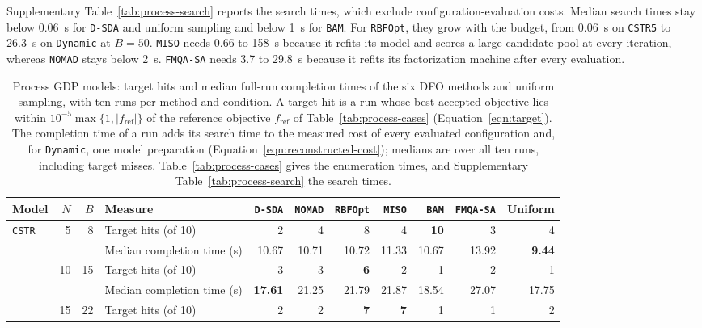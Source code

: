 \documentclass{article}
\begin{document}
Supplementary Table~\ref{tab:process-search} reports the search times, which exclude configuration-evaluation costs.
Median search times stay below 0.06~s for \texttt{D-SDA} and uniform sampling and below 1~s for \texttt{BAM}.
For \texttt{RBFOpt}, they grow with the budget, from 0.06~s on \texttt{CSTR5} to 26.3~s on \texttt{Dynamic} at \(B=50\).
\texttt{MISO} needs 0.66 to 158~s because it refits its model and scores a large candidate pool at every iteration, whereas \texttt{NOMAD} stays below 2~s.
\texttt{FMQA-SA} needs 3.7 to 29.8~s because it refits its factorization machine after every evaluation.
\begin{table}[htbp]
\centering
\caption{Process GDP models: target hits and median full-run completion times of the six DFO methods and uniform sampling, with ten runs per method and condition.
A target hit is a run whose best accepted objective lies within \(10^{-5}\max\{1,|f_{\mathrm{ref}}|\}\) of the reference objective \(f_{\mathrm{ref}}\) of Table~\ref{tab:process-cases} (Equation~\eqref{eqn:target}).
The completion time of a run adds its search time to the measured cost of every evaluated configuration and, for \texttt{Dynamic}, one model preparation (Equation~\eqref{eqn:reconstructed-cost}); medians are over all ten runs, including target misses.
Table~\ref{tab:process-cases} gives the enumeration times, and Supplementary Table~\ref{tab:process-search} the search times.}
\label{tab:process-targets}
\footnotesize
\setlength{\tabcolsep}{3.5pt}
\begin{threeparttable}
\begin{tabular}{@{}lrrlrrrrrrr@{}}\toprule
Model & \(N\) & \(B\) & Measure & \texttt{D-SDA} & \texttt{NOMAD} & \texttt{RBFOpt} & \texttt{MISO} & \texttt{BAM} & \texttt{FMQA-SA} & Uniform \\\midrule
\multirow{12}{*}{\texttt{CSTR}} & \multirow{2}{*}{5} & \multirow{2}{*}{8} & Target hits (of 10) & 2 & 4 & 8 & 4 & \textbf{10} & 3 & 4 \\
 & &  & Median completion time (s) & 10.67 & 10.71 & 10.72 & 11.33 & 10.67 & 13.92 & \textbf{9.44} \\
\addlinespace[2pt]
 & \multirow{2}{*}{10} & \multirow{2}{*}{15} & Target hits (of 10) & 3 & 3 & \textbf{6} & 2 & 1 & 2 & 1 \\
 & &  & Median completion time (s) & \textbf{17.61} & 21.25 & 21.79 & 21.87 & 18.54 & 27.07 & 17.75 \\
\addlinespace[2pt]
 & \multirow{2}{*}{15} & \multirow{2}{*}{22} & Target hits (of 10) & 2 & 2 & \textbf{7} & \textbf{7} & 1 & 1 & 2 \\

\end{tabular}
\end{threeparttable}
\end{table}
\end{document}
